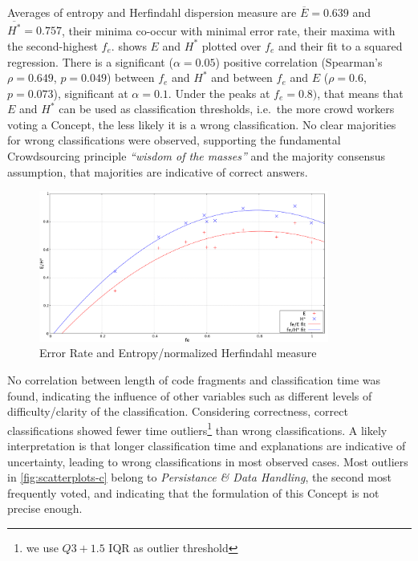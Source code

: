 Averages of entropy and Herfindahl dispersion measure are \(\overline E = 0.639\) and \(\overline{H^*} = 0.757\), their minima co-occur with minimal error rate, their maxima with the second-highest \(f_e\).
 shows \(E\) and \(H^*\) plotted over \(f_e\) and their fit to a squared regression.
There is a significant (\(\alpha=0.05\)) positive correlation (Spearman's \(\rho=0.649\), \(p=0.049\)) between \(f_e\) and \(H^*\) and between \(f_e\) and \(E\) (\(\rho=0.6\), \(p=0.073\)), significant at \(\alpha=0.1\).
Under the peaks at \(f_e=0.8)\), that means that \(E\) and \(H^*\) can be used as classification thresholds, i.e.~the more crowd workers voting a \gls{Concept}, the less likely it is a wrong classification.
No clear majorities for wrong classifications were observed, supporting the fundamental \gls{Crowdsourcing} principle \emph{``wisdom of the masses''} and the majority consensus assumption, that majorities are indicative of correct answers.

\begin{figure}[h!]
\hypertarget{fig:crowd-errors}{%
\centering
\includegraphics[width=0.85\textwidth]{../figures/crowd-errors.pdf}
\caption{Error Rate and Entropy/normalized Herfindahl measure}\label{fig:crowd-errors}
}
\end{figure}

No correlation between length of code fragments and classification time was found, indicating the influence of other variables such as different levels of difficulty/clarity of the classification.
Considering correctness, correct classifications showed fewer time outliers\footnote{we use \(Q3 + 1.5 \text{ IQR}\) as outlier threshold} than wrong classifications.
A likely interpretation is that longer classification time and explanations are indicative of uncertainty, leading to wrong classifications in most observed cases.
Most outliers in \cref{fig:scatterplots-c} belong to \emph{Persistance \& Data Handling}, the second most frequently voted, and indicating that the formulation of this \gls{Concept} is not precise enough.

